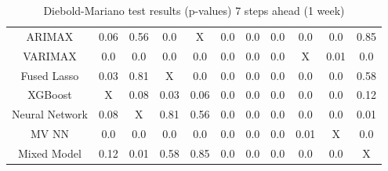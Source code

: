 \begin{landscape}
\begin{table}[]
\begin{tabular}{|c|c c c c c c c c c c|}
        ARIMAX & 0.06 & 0.56 & 0.0 & X & 0.0 & 0.0 & 0.0 & 0.0 & 0.0 & 0.85\\
        VARIMAX & 0.0 & 0.0 & 0.0 & 0.0 & 0.0 & 0.0 & 0.0 & X & 0.01 & 0.0\\
        Fused Lasso & 0.03 & 0.81 & X & 0.0 & 0.0 & 0.0 & 0.0 & 0.0 & 0.0 & 0.58\\
        XGBoost & X & 0.08 & 0.03 & 0.06 & 0.0 & 0.0 & 0.0 & 0.0 & 0.0 & 0.12\\
        Neural Network & 0.08 & X & 0.81 & 0.56 & 0.0 & 0.0 & 0.0 & 0.0 & 0.0 & 0.01\\
        MV NN & 0.0 & 0.0 & 0.0 & 0.0 & 0.0 & 0.0 & 0.0 & 0.01 & X & 0.0\\
        Mixed Model & 0.12 & 0.01 & 0.58 & 0.85 & 0.0 & 0.0 & 0.0 & 0.0 & 0.0 & X\\
    \hline
    \end{tabular}
    \caption{Diebold-Mariano test results (p-values) 7 steps ahead (1 week)}
    \label{tab:1 week ahead diebold}
\end{table}
\end{landscape}

